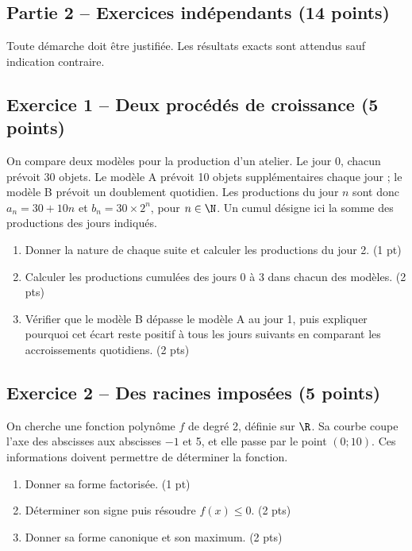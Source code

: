 \clearpage\subsection*{Partie 2 -- Exercices indépendants (14 points)}
Toute démarche doit être justifiée. Les résultats exacts sont attendus sauf indication contraire.
\subsection*{Exercice 1 -- Deux procédés de croissance (5 points)}
On compare deux modèles pour la production d’un atelier. Le jour 0, chacun prévoit 30 objets. Le modèle A prévoit 10 objets supplémentaires chaque jour ; le modèle B prévoit un doublement quotidien. Les productions du jour $n$ sont donc $a_n=30+10n$ et $b_n=30\times2^n$, pour $n\in\N$. Un cumul désigne ici la somme des productions des jours indiqués.
\begin{enumerate}
\item Donner la nature de chaque suite et calculer les productions du jour 2. \hfill(1 pt)
\item Calculer les productions cumulées des jours 0 à 3 dans chacun des modèles. \hfill(2 pts)
\item Vérifier que le modèle B dépasse le modèle A au jour 1, puis expliquer pourquoi cet écart reste positif à tous les jours suivants en comparant les accroissements quotidiens. \hfill(2 pts)
\end{enumerate}
\subsection*{Exercice 2 -- Des racines imposées (5 points)}
On cherche une fonction polynôme $f$ de degré 2, définie sur $\R$. Sa courbe coupe l’axe des abscisses aux abscisses $-1$ et 5, et elle passe par le point $(0;10)$. Ces informations doivent permettre de déterminer la fonction.
\begin{enumerate}
\item Donner sa forme factorisée. \hfill(1 pt)
\item Déterminer son signe puis résoudre $f(x)\leq0$. \hfill(2 pts)
\item Donner sa forme canonique et son maximum. \hfill(2 pts)
\end{enumerate}
